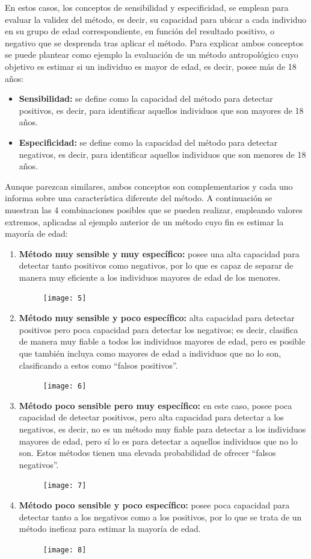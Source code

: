 \documentclass[a4paper,11pt]{article}
\begin{document}
En estos casos, los conceptos de sensibilidad y especificidad, se emplean para evaluar la validez del método, es decir, su capacidad para ubicar a cada individuo en su grupo de edad correspondiente, en función del resultado positivo, o negativo que se desprenda tras aplicar el método. Para explicar ambos conceptos se puede plantear como ejemplo la evaluación de un método antropológico cuyo objetivo es estimar si un individuo es mayor de edad, es decir, posee más de 18 años:
\begin{itemize}
\item {\bf Sensibilidad:} se define como la capacidad del método para detectar positivos, es decir, para identificar aquellos individuos que son mayores de 18 años.
\item {\bf Especificidad:} se define como la capacidad del método para detectar negativos, es decir, para identificar aquellos individuos que son menores de 18 años.
\end{itemize}
Aunque parezcan similares, ambos conceptos son complementarios y cada uno informa sobre una característica diferente del método. A continuación se muestran las 4 combinaciones posibles que se pueden realizar, empleando valores extremos, aplicadas al ejemplo anterior de un método cuyo fin es estimar la mayoría de edad:
\begin{enumerate}
\item {\bf Método muy sensible y muy específico:} posee una alta capacidad para detectar tanto positivos como negativos, por lo que es capaz de separar de manera muy eficiente a los individuos mayores de edad de los menores.
\begin{figure}[h!]
\centering
\texttt{[image: 5]}
\end{figure}
\item {\bf Método muy sensible y poco específico:} alta capacidad para detectar positivos pero poca capacidad para detectar los negativos; es decir, clasifica de manera muy fiable a todos los individuos mayores de edad, pero es posible que también incluya como mayores de edad a individuos que no lo son, clasificando a estos como “falsos positivos”.
\begin{figure}[h!]
\centering
\texttt{[image: 6]}
\end{figure}
\item {\bf Método poco sensible pero muy específico:} en este caso, posee poca capacidad de detectar positivos, pero alta capacidad para detectar a los negativos, es decir, no es un método muy fiable para detectar a los individuos mayores de edad, pero sí lo es para detectar a aquellos individuos que no lo son. Estos métodos tienen una elevada probabilidad de ofrecer “falsos negativos”.
\begin{figure}[h!]
\centering
\texttt{[image: 7]}
\end{figure}
\item {\bf Método poco sensible y poco específico:} posee poca capacidad para detectar tanto a los negativos como a los positivos, por lo que se trata de un método ineficaz para estimar la mayoría de edad.
\begin{figure}[h!]
\centering
\texttt{[image: 8]}
\end{figure}
\end{enumerate}
\end{document}
